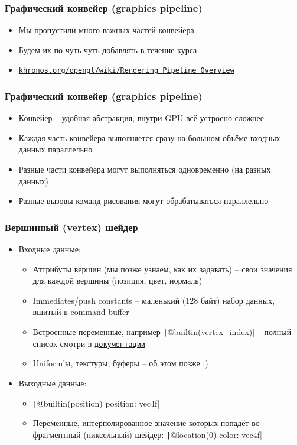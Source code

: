 \documentclass[10pt]{beamer}
\begin{document}
\begin{frame}[fragile]
\frametitle{Графический конвейер (graphics pipeline)}
\begin{itemize}
\item Мы пропустили много важных частей конвейера
\item Будем их по чуть-чуть добавлять в течение курса
\item \href{https://www.khronos.org/opengl/wiki/Rendering_Pipeline_Overview}{\nolinkurl{khronos.org/opengl/wiki/Rendering_Pipeline_Overview}}
\end{itemize}
\end{frame}

\begin{frame}
\frametitle{Графический конвейер (graphics pipeline)}
\begin{itemize}
\item Конвейер -- удобная абстракция, внутри GPU всё устроено сложнее
\pause
\item Каждая часть конвейера выполняется сразу на большом объёме входных данных параллельно
\pause
\item Разные части конвейера могут выполняться одновременно (на разных данных)
\pause
\item Разные вызовы команд рисования могут обрабатываться параллельно
\end{itemize}
\end{frame}

\begin{frame}[fragile]
\frametitle{Вершинный (vertex) шейдер}
\begin{itemize}
\pause
\item Входные данные:
\pause
\begin{itemize}
\item Аттрибуты вершин (мы позже узнаем, как их задавать) -- свои значения для каждой вершины (позиция, цвет, нормаль)
\pause
\item Immediates/push constants -- маленький (128 байт) набор данных, вшитый в command buffer
\pause
\item Встроенные переменные, например \texttt|@builtin(vertex_index)| -- полный список смотри в \href{https://gpuweb.github.io/gpuweb/wgsl/#builtin-inputs-outputs}{\nolinkurl{документации}}
\pause
\item Uniform'ы, текстуры, буферы -- об этом позже :)
\end{itemize}
\pause
\item Выходные данные:
\begin{itemize}
\item \texttt|@builtin(position) position: vec4f|
\pause
\item Переменные, интерполированное значение которых попадёт во фрагментный (пиксельный) шейдер: \texttt|@location(0) color: vec4f|
\end{itemize}
\end{itemize}
\end{frame}
\end{document}
